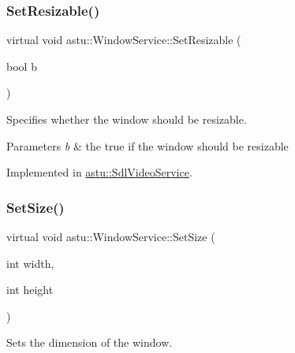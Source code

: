 \mbox{\label{classastu_1_1WindowService_a78bee95831f4497fcee7b8d10575f0d8}} 
\subsubsection{\texorpdfstring{Set\+Resizable()}{SetResizable()}}
{\footnotesize\ttfamily virtual void astu\+::\+Window\+Service\+::\+Set\+Resizable (\begin{DoxyParamCaption}\item[{bool}]{b }\end{DoxyParamCaption})\hspace{0.3cm}{\ttfamily [pure virtual]}}

Specifies whether the window should be resizable.


\begin{DoxyParams}{Parameters}
{\em b} & the {\ttfamily true} if the window should be resizable \\
\hline
\end{DoxyParams}


Implemented in \hyperlink{classastu_1_1SdlVideoService_ab50969b38dedf29146704898a74df5ae}{astu\+::\+Sdl\+Video\+Service}.

\mbox{\label{classastu_1_1WindowService_a77fb8b7272b58e39c7d003923034eedf}} 
\subsubsection{\texorpdfstring{Set\+Size()}{SetSize()}\hspace{0.1cm}{\footnotesize\ttfamily [1/2]}}
{\footnotesize\ttfamily virtual void astu\+::\+Window\+Service\+::\+Set\+Size (\begin{DoxyParamCaption}\item[{int}]{width,  }\item[{int}]{height }\end{DoxyParamCaption})\hspace{0.3cm}{\ttfamily [pure virtual]}}

Sets the dimension of the window.


